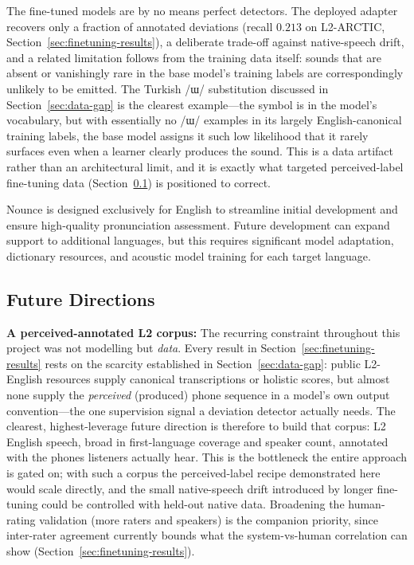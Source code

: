 \documentclass[a4paper,12pt]{report}
\newcommand{\ipa}[1]{{\ipafont #1}}
\begin{document}
The fine-tuned models are by no means perfect detectors. The deployed adapter recovers only a fraction of annotated deviations (recall $0.213$ on L2-ARCTIC, Section~\ref{sec:finetuning-results}), a deliberate trade-off against native-speech drift, and a related limitation follows from the training data itself: sounds that are absent or vanishingly rare in the base model's training labels are correspondingly unlikely to be emitted. The Turkish \ipa{/ɯ/} substitution discussed in Section~\ref{sec:data-gap} is the clearest example---the symbol is in the model's vocabulary, but with essentially no \ipa{/ɯ/} examples in its largely English-canonical training labels, the base model assigns it such low likelihood that it rarely surfaces even when a learner clearly produces the sound. This is a data artifact rather than an architectural limit, and it is exactly what targeted perceived-label fine-tuning data (Section~\ref{sec:future-work}) is positioned to correct.

Nounce is designed exclusively for English to streamline initial development and ensure high-quality pronunciation assessment. Future development can expand support to additional languages, but this requires significant model adaptation, dictionary resources, and acoustic model training for each target language.

\subsection{Future Directions}
\label{sec:future-work}

\textbf{A perceived-annotated L2 corpus:} The recurring constraint throughout this project was not modelling but \emph{data}. Every result in Section~\ref{sec:finetuning-results} rests on the scarcity established in Section~\ref{sec:data-gap}: public L2-English resources supply canonical transcriptions or holistic scores, but almost none supply the \emph{perceived} (produced) phone sequence in a model's own output convention---the one supervision signal a deviation detector actually needs. The clearest, highest-leverage future direction is therefore to build that corpus: L2 English speech, broad in first-language coverage and speaker count, annotated with the phones listeners actually hear. This is the bottleneck the entire approach is gated on; with such a corpus the perceived-label recipe demonstrated here would scale directly, and the small native-speech drift introduced by longer fine-tuning could be controlled with held-out native data. Broadening the human-rating validation (more raters and speakers) is the companion priority, since inter-rater agreement currently bounds what the system-vs-human correlation can show (Section~\ref{sec:finetuning-results}).
\end{document}
